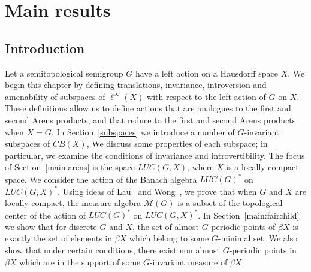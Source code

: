 \chapter{Main results}

\section{Introduction}

Let a semitopological semigroup $G$ have a left action on a Hausdorff space $X$.
We begin this chapter by defining translations, invariance, introversion and
amenability of subspaces of $\ell^\infty(X)$ with respect to the left action of $G$ on $X$.
These definitions allow us to define actions that are analogues to the first and second
Arens products, and that reduce to the first and second Arens products when $X = G$.
In Section~\ref{subspaces} we introduce a number of $G$-invariant subspaces of $CB(X)$,
We discuss some properties of each subspace; in particular, we examine
the conditions of invariance and introvertibility.
The focus of Section~\ref{main:arens} is the space $LUC(G,X)$, where $X$
is a locally compact space.
We consider the action of the Banach algebra $LUC(G)^*$ on $LUC(G,X)^*$.
Using ideas of Lau~\cite{lau:arens} and Wong~\cite{wong:arens},
we prove that when $G$ and $X$ are locally compact, the measure
algebra $\mathcal{M}(G)$ is a subset of the topological
center of the action of $LUC(G)^*$ on $LUC(G,X)^*$.
In Section~\ref{main:fairchild} we show that for discrete $G$ and $X$, the set of almost $G$-periodic
points of $\beta X$ is exactly the set of elements in $\beta X$ which belong to some
$G$-minimal set.  We also show that under certain conditions, there exist non almost
$G$-periodic points in $\beta X$ which are in the support of some $G$-invariant measure
of $\beta X$.


